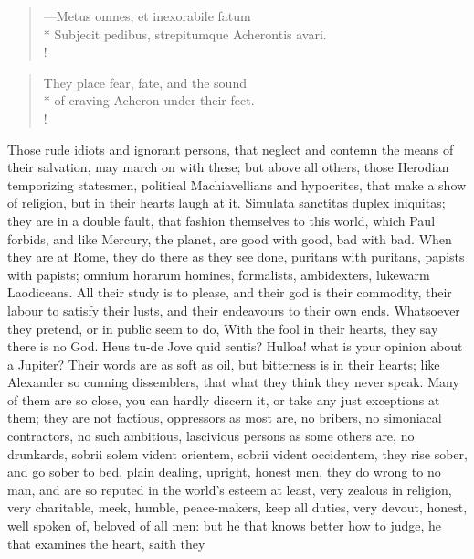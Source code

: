 {\begin{latin}
\begin{verse}%
---Metus omnes, et inexorabile fatum\\*
Subjecit pedibus, strepitumque Acherontis avari.\\!
\end{verse}%
\end{latin}
\translationrule%
\begin{verse}%
They place fear, fate, and the sound\\*
of craving Acheron under their feet.\\!
\end{verse}%

Those rude idiots and ignorant persons, that neglect and contemn the
means of their salvation, may march on with these; but above all
others, those Herodian temporizing statesmen, political Machiavellians
and hypocrites, that make a show of religion, but in their hearts laugh
at it. Simulata sanctitas duplex iniquitas; they are in a double fault,
that fashion themselves to this world, which Paul forbids, and
like Mercury, the planet, are good with good, bad with bad. When they
are at Rome, they do there as they see done, puritans with puritans,
papists with papists; omnium horarum homines, formalists, ambidexters,
lukewarm Laodiceans. All their study is to please, and their god
is their commodity, their labour to satisfy their lusts, and their
endeavours to their own ends. Whatsoever they pretend, or in public
seem to do, With the fool in their hearts, they say there is no
God. Heus tu-de Jove quid sentis? Hulloa! what is your opinion about a
Jupiter? Their words are as soft as oil, but bitterness is in their
hearts; like Alexander so cunning dissemblers, that what they
think they never speak. Many of them are so close, you can hardly
discern it, or take any just exceptions at them; they are not factious,
oppressors as most are, no bribers, no simoniacal contractors, no such
ambitious, lascivious persons as some others are, no drunkards, sobrii
solem vident orientem, sobrii vident occidentem, they rise sober, and
go sober to bed, plain dealing, upright, honest men, they do wrong to
no man, and are so reputed in the world's esteem at least, very zealous
in religion, very charitable, meek, humble, peace-makers, keep all
duties, very devout, honest, well spoken of, beloved of all men: but he
that knows better how to judge, he that examines the heart, saith they
}
